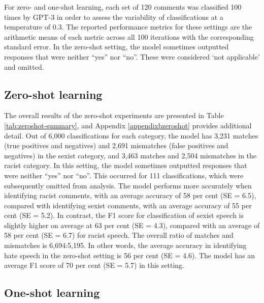 \documentclass{bmcart}
\begin{document}
For zero- and one-shot learning, each set of 120 comments was classified 100 times by GPT-3 in order to assess the variability of classifications at a temperature of 0.3. The reported performance metrics for these settings are the arithmetic means of each metric across all 100 iterations with the corresponding standard error. In the zero-shot setting, the model sometimes outputted responses that were neither ``yes'' nor ``no''. These were considered `not applicable' and omitted.


\subsection{Zero-shot learning}\label{zero-shot-learning-1}

The overall results of the zero-shot experiments are presented in Table \ref{tab:zeroshot-summary}, and Appendix \ref{appendixbzeroshot} provides additional detail. Out of 6,000 classifications for each category, the model has 3,231 matches (true positives and negatives) and 2,691 mismatches (false positives and negatives) in the sexist category, and 3,463 matches and 2,504 mismatches in the racist category. In this setting, the model sometimes outputted responses that were neither ``yes'' nor ``no''. This occurred for 111 classifications, which were subsequently omitted from analysis. The model performs more accurately when identifying racist comments, with an average accuracy of 58 per cent (SE = 6.5), compared with identifying sexist comments, with an average accuracy of 55 per cent (SE = 5.2). In contrast, the F1 score for classification of sexist speech is slightly higher on average at 63 per cent (SE = 4.3), compared with an average of 58 per cent (SE = 6.7) for racist speech. The overall ratio of matches and mismatches is 6,694:5,195. In other words, the average accuracy in identifying hate speech in the zero-shot setting is 56 per cent (SE = 4.6). The model has an average F1 score of 70 per cent (SE = 5.7) in this setting.




\subsection{One-shot learning}\label{one-shot-learning-1}
\end{document}
